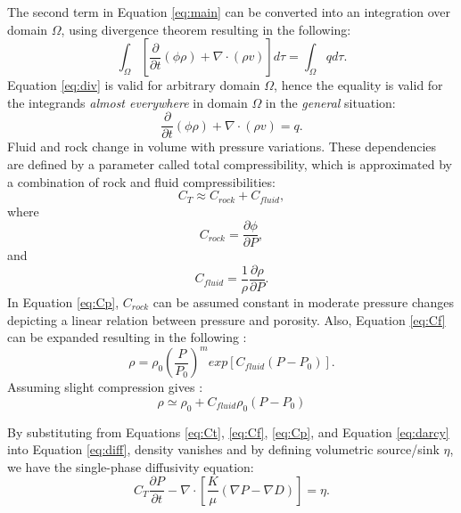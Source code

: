 The second term in Equation \ref{eq:main} can be converted into an integration
over domain $\Omega$, using divergence theorem resulting in the following:
\begin{equation}
  \int_{\Omega}[\frac{\partial}{\partial t}(\phi\rho)+\nabla \cdot (\rho
v)]d\tau=\int_{\Omega}qd\tau.
  \label{eq:div}
\end{equation} Equation \ref{eq:div} is valid for arbitrary domain $\Omega$,
hence the equality is valid for the integrands \textit{almost everywhere} in
domain $\Omega$ in the \textit{general} situation:
\begin{equation}
 \frac{\partial}{\partial t}(\phi\rho)+\nabla \cdot (\rho v)=q.
 \label{eq:diff}
\end{equation}
Fluid and rock change in volume with pressure variations. These dependencies are
defined by a parameter called total compressibility, which is approximated by a
combination of rock and fluid compressibilities:
\begin{equation}
  C_{T}\approx C_{rock}+C_{fluid},
  \label{eq:Ct}
\end{equation} where
\begin{equation}
  C_{rock}=\frac{\partial \phi}{\partial P},
  \label{eq:Cp}
\end{equation} and
\begin{equation}
  C_{fluid}=\frac{1}{\rho} \frac{\partial \rho}{\partial P}.
  \label{eq:Cf}
\end{equation} In Equation \ref{eq:Cp}, $C_{rock}$ can be assumed constant in
moderate pressure changes depicting a linear relation between pressure and
porosity. Also, Equation \ref{eq:Cf} can be expanded resulting in the following
\cite{muskatflow}:
\begin{equation}
 \rho=\rho_0 (\frac{P}{P_0})^m exp[C_{fluid}(P-P_0)].
 \label{eq:Cexp}
\end{equation} Assuming slight compression gives \cite{sahimi2011flow}:
\begin{equation}
 \rho \simeq \rho_0 + C_{fluid} \rho_0 (P-P_0)
 \label{eq:Cslg}
\end{equation}

By substituting from Equations \ref{eq:Ct}, \ref{eq:Cf}, \ref{eq:Cp}, and
Equation \ref{eq:darcy} into Equation \ref{eq:diff}, density vanishes and by
defining volumetric source/sink $\eta$, we have the single-phase diffusivity
equation:
\begin{equation}
 C_T \frac{\partial P}{\partial t}-\nabla \cdot [\frac{K}{\mu} (\nabla P -
\nabla D)] = \eta.
 \label{eq:vol}
\end{equation}

